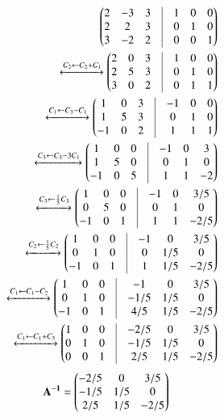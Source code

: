 \documentclass[journal,12pt,twocolumn]{IEEEtran}
\begin{document}
\begin{align}
	\myvec{
		2 & -3 & 3 & \vrule & 1 & 0 & 0 \\
		2 & 2 & 3 & \vrule & 0 & 1 & 0 \\ 
		3 & -2 & 2 & \vrule & 0 & 0 & 1\\
	}
	\\
	\xleftrightarrow[]{C_2 \leftarrow C_2 + C_1}
	\myvec{
		2 & 0 & 3 & \vrule & 1 & 0 & 0 \\
		2 & 5 & 3 & \vrule & 0 & 1 & 0 \\ 
		3 & 0 & 2 & \vrule & 0 & 1 & 1\\
	}
	\\
	\xleftrightarrow[]{C_1\leftarrow C_3 - C_1}
	\myvec{
		1 & 0 & 3 & \vrule & -1 & 0 & 0 \\
		1 & 5 & 3 & \vrule & 0 & 1 & 0 \\ 
		-1 & 0 & 2 & \vrule & 1 & 1 & 1\\
	}
	\\
	\xleftrightarrow[]{C_3 \leftarrow C_3 - 3C_1}
	\myvec{
		1 & 0 & 0 & \vrule & -1 & 0 & 3 \\
		1 & 5 & 0 & \vrule & 0 & 1 & 0 \\ 
		-1 & 0 & 5 & \vrule & 1 & 1 & -2\\
	}
	\\
	\xleftrightarrow[]{C_3 \leftarrow \frac{1}{5}C_3}
	\myvec{
		1 & 0 & 0 & \vrule & -1 & 0 & 3/5 \\
		0 & 5 & 0 & \vrule & 0 & 1 & 0 \\ 
		-1 & 0 & 1 & \vrule & 1 & 1 & -2/5\\
	}
	\\
	\xleftrightarrow[]{C_2 \leftarrow \frac{1}{5}C_2}
	\myvec{
		1 & 0 & 0 & \vrule & -1 & 0 & 3/5 \\
		0 & 1 & 0 & \vrule & 0 & 1/5 & 0 \\ 
		-1 & 0 & 1 & \vrule & 1 & 1/5 & -2/5\\
	}
	\\
    \xleftrightarrow[]{C_1 \leftarrow C_1 - C_2}
	\myvec{
		1 & 0 & 0 & \vrule & -1 & 0 & 3/5 \\
		0 & 1 & 0 & \vrule & -1/5 & 1/5 & 0 \\ 
		-1 & 0 & 1 & \vrule & 4/5 & 1/5 & -2/5\\
	}
	\\
	\xleftrightarrow[]{C_1 \leftarrow C_1 + C_3}
	\myvec{
		1 & 0 & 0 & \vrule & -2/5 & 0 & 3/5 \\
		0 & 1 & 0 & \vrule & -1/5 & 1/5 & 0 \\ 
		0 & 0 & 1 & \vrule & 2/5 & 1/5 & -2/5\\
	}
\end{align}
\begin{align}
\mathbf {A^{-1}} &= {\begin{pmatrix}-2/5 & 0 & 3/5\\-1/5 & 1/5 & 0\\2/5 & 1/5 & -2/5\end{pmatrix}}
\end{align}
\end{document}
